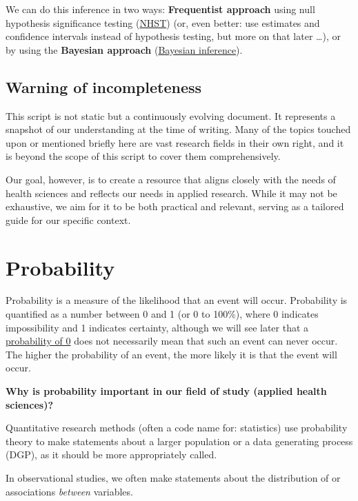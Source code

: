 \documentclass[
]{book}
\begin{document}
We can do this inference in two ways: \textbf{Frequentist approach} using null hypothesis significance
testing (\hyperref[nhst]{NHST}) (or, even better: use estimates and confidence intervals instead of hypothesis testing,
but more on that later \ldots), or by using the \textbf{Bayesian approach} (\hyperref[bayes_statistics]{Bayesian inference}).

\section*{Warning of incompleteness}\label{warning-of-incompleteness}

This script is not static but a continuously evolving document.
It represents a snapshot of our understanding at the time of writing.
Many of the topics touched upon or mentioned briefly here are vast research fields
in their own right, and it is beyond the scope of this script to cover them comprehensively.

Our goal, however, is to create a resource that aligns closely with the needs
of health sciences and reflects our needs in applied research.
While it may not be exhaustive, we aim for it to be both practical and relevant,
serving as a tailored guide for our specific context.

\chapter{Probability}\label{probs}

Probability is a measure of the likelihood that an event will occur. Probability is quantified as a number between 0 and 1 (or 0 to 100\%),
where 0 indicates impossibility and 1 indicates certainty, although we will see later that a \href{https://stats.stackexchange.com/questions/273382/how-can-the-probability-of-each-point-be-zero-in-continuous-random-variable}{probability of 0} does not necessarily mean that such an event can never occur.
The higher the probability of an event, the more likely it is that the event will occur.

\textbf{Why is probability important in our field of study (applied health sciences)?}

Quantitative research methods (often a code name for: statistics) use probability theory to make statements about a larger
population or a data generating process (DGP), as it should be more appropriately called.

In observational studies, we often make statements about the distribution of or
associations \emph{between} variables.
\end{document}
